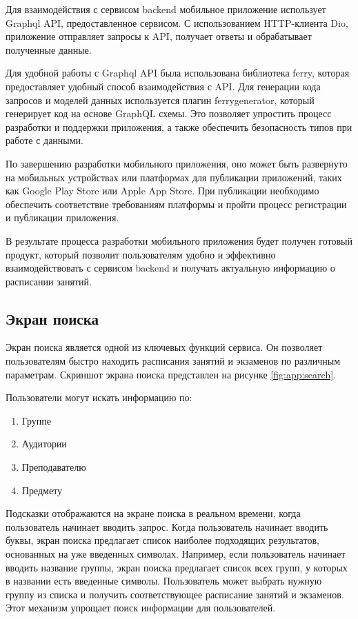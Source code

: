 Для взаимодействия с сервисом backend мобильное приложение использует Graphql API,
предоставленное сервисом. С использованием HTTP-клиента Dio, приложение отправляет запросы к API,
получает ответы и обрабатывает полученные данные.

Для удобной работы с Graphql API была использована библиотека ferry, которая предоставляет удобный способ взаимодействия с API.
Для генерации кода запросов и моделей данных используется плагин ferry\textunderscore generator, который генерирует код на основе GraphQL схемы.
Это позволяет упростить процесс разработки и поддержки приложения, а также обеспечить безопасность типов при работе с данными.

По завершению разработки мобильного приложения, оно может быть развернуто на мобильных устройствах или платформах для публикации приложений, 
таких как Google Play Store или Apple App Store. При публикации необходимо обеспечить 
соответствие требованиям платформы и пройти процесс регистрации и публикации приложения.

В результате процесса разработки мобильного приложения будет получен готовый продукт, 
который позволит пользователям удобно и эффективно взаимодействовать с сервисом backend 
и получать актуальную информацию о расписании занятий.

\subsection{Экран поиска}
Экран поиска является одной из ключевых функций сервиса.
Он позволяет пользователям быстро находить расписания занятий и экзаменов по различным параметрам.
Скриншот экрана поиска представлен на рисунке \ref{fig:app:search}.

Пользователи могут искать информацию по:
\begin{enumerate}
    \item Группе
    \item Аудитории
    \item Преподавателю
    \item Предмету
\end{enumerate}

Подсказки отображаются на экране поиска в реальном времени, когда пользователь начинает вводить запрос.
Когда пользователь начинает вводить буквы, экран поиска предлагает список наиболее подходящих результатов,
основанных на уже введенных символах.
Например, если пользователь начинает вводить название группы,
экран поиска предлагает список всех групп, у которых в названии есть введенные символы.
Пользователь может выбрать нужную группу из списка и получить соответствующее расписание занятий и экзаменов.
Этот механизм упрощает поиск информации для пользователей.

